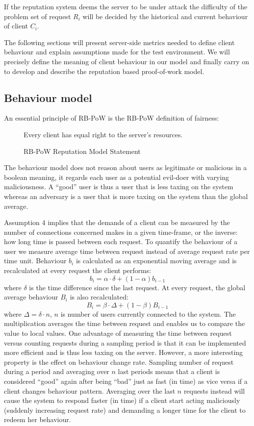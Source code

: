 If the reputation system deems the server to be under attack the difficulty of the problem set of request $R_i$ will be decided by the historical and current behaviour of client $C_i$. 

The following sections will present server-side metrics needed to define client behaviour and explain assumptions made for the test environment. 
We will precisely define the meaning of client behaviour in our model and finally carry on to develop and describe the reputation based proof-of-work model.




\subsection{Behaviour model}\label{tab:behaviourmodel}
An essential principle of RB-PoW is the RB-PoW definition of fairness:
\begin{figure}[H]
\begin{GrayBox}[0.65\textwidth]
Every client has equal right to the server's resources.
\end{GrayBox}
\caption{RB-PoW Reputation Model Statement}
\end{figure}
The behaviour model does not reason about users as legitimate or malicious in a boolean meaning, it regards each user as a potential evil-doer with varying maliciousness. A ``good'' user is thus a user that is less taxing on the system whereas an adversary is a user that is more taxing on the system than the global average.  

Assumption 4 implies that the demands of a client can be measured by the number of connections concerned makes in a given time-frame, or the inverse: how long time is passed between each request. 
To quantify the behaviour of a user we measure average time between request instead of average request rate per time unit. Behaviour $b_i$ is calculated as an exponential moving average and is recalculated at every request the client performs:
 $$ b_{i} = \alpha\cdot\delta + (1-\alpha)b_{i-1} $$
where $\delta$ is the time difference since the last request. At every request, the global average behaviour $B_i$ is also recalculated:
$$ B_{i} = \beta\cdot\Delta + (1-\beta)B_{i-1} $$
where $\Delta = \delta \cdot n$, $n$ is number of users currently connected to the system. The multiplication averages the time between request and enables us to compare the value to local values. 
One advantage of measuring the time between request versus counting requests during a sampling period is that it can be implemented more efficient and is thus less taxing on the server. However, a more interesting property is the effect on behaviour change rate. Sampling number of request during a period and averaging over $n$ last periods means that a client is considered ``good'' again after being ``bad'' just as fast (in time) as vice versa if a client changes behaviour pattern.
Averaging over the last $n$ requests instead will cause the system to respond faster (in time) if a client start acting maliciously (suddenly increasing request rate) and demanding a longer time for the client to redeem her behaviour.


